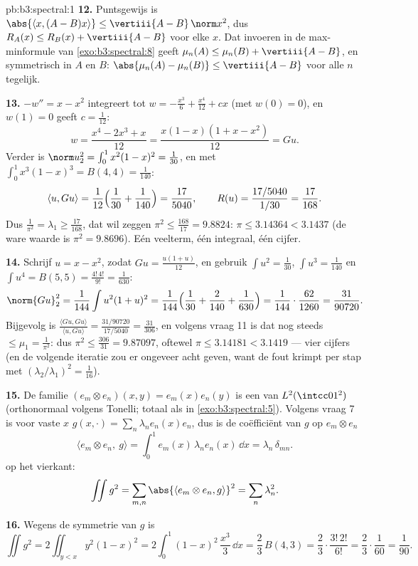 \begin{solution}{pb:b3:spectral:1}
\textbf{12.} Puntsgewijs is $\abs{\langle x, (A - B)x\rangle}
\leq \vertiii{A - B}\,\norm x^2$, dus $R_A(x) \leq R_B(x) +
\vertiii{A - B}$ voor elke $x$. Dat invoeren in de
max-minformule van \cref{exo:b3:spectral:8} geeft $\mu_n(A) \leq
\mu_n(B) + \vertiii{A - B}$, en symmetrisch in $A$ en $B$:
$\abs{\mu_n(A) - \mu_n(B)} \leq \vertiii{A - B}$ voor alle $n$
tegelijk.

\textbf{13.} $-w'' = x - x^2$ integreert tot $w = -\frac{x^3}6 +
\frac{x^4}{12} + cx$ (met $w(0) = 0$), en $w(1) = 0$ geeft $c =
\frac1{12}$:
\[
w = \frac{x^4 - 2x^3 + x}{12} = \frac{x(1-x)(1 + x -
x^2)}{12} = Gu .
\]
Verder is $\norm u_2^2 = \int_0^1x^2(1-x)^2 = \frac1{30}$, en met
$\int_0^1x^3(1-x)^3 = B(4,4) = \frac1{140}$:
\[
\langle u, Gu\rangle = \frac1{12}\Bigl(\frac1{30} +
\frac1{140}\Bigr) = \frac{17}{5040},
\qquad
R(u) = \frac{17/5040}{1/30} = \frac{17}{168} .
\]
Dus $\frac1{\pi^2} = \lambda_1 \geq \frac{17}{168}$, dat wil
zeggen $\pi^2 \leq \frac{168}{17} = 9.8824$: $\pi \leq 3.14364 <
3.1437$ (de ware waarde is $\pi^2 = 9.8696$). Eén veelterm, één
integraal, één cijfer.

\textbf{14.} Schrijf $u = x - x^2$, zodat $Gu = \frac{u(1 +
u)}{12}$, en gebruik $\int u^2 = \frac1{30}$, $\int u^3 =
\frac1{140}$ en $\int u^4 = B(5,5) = \frac{4!\,4!}{9!} =
\frac1{630}$:
\[
\norm{Gu}_2^2 = \frac1{144}\int u^2(1+u)^2 =
\frac1{144}\Bigl(\frac1{30} + \frac2{140} +
\frac1{630}\Bigr) = \frac1{144}\cdot\frac{62}{1260} =
\frac{31}{90720} .
\]
Bijgevolg is $\frac{\langle Gu, Gu\rangle}{\langle u, Gu\rangle}
= \frac{31/90720}{17/5040} = \frac{31}{306}$, en volgens vraag 11
is dat nog steeds $\leq \mu_1 = \frac1{\pi^2}$: dus $\pi^2 \leq
\frac{306}{31} = 9.87097$, oftewel $\pi \leq 3.14181 < 3.1419$
--- vier cijfers (en de volgende iteratie zou er ongeveer acht
geven, want de fout krimpt per stap met
$(\lambda_2/\lambda_1)^2 = \frac1{16}$).

\textbf{15.} De familie $(e_m \otimes e_n)(x,y) = e_m(x)e_n(y)$
is een  van $L^2(\intcc01^2)$ (orthonormaal volgens
Tonelli; totaal als in \cref{exo:b3:spectral:5}). Volgens vraag 7
is voor vaste $x$ $g(x, \cdot) = \sum_n\lambda_ne_n(x)e_n$, dus
is de coëfficiënt van $g$ op $e_m\otimes e_n$
\[
\langle e_m\otimes e_n,\ g\rangle
= \int_0^1 e_m(x)\,\lambda_n e_n(x)\,\dd x
= \lambda_n\,\delta_{mn} .
\]
 op het vierkant:
\[
\iint g^2 = \sum_{m,n}\abs{\langle e_m\otimes e_n,
g\rangle}^2 = \sum_n\lambda_n^2 .
\]

\textbf{16.} Wegens de symmetrie van $g$ is
\[
\iint g^2 = 2\iint_{y<x}y^2(1-x)^2
= 2\int_0^1(1-x)^2\,\frac{x^3}3\,\dd x
= \frac23\,B(4, 3) = \frac23\cdot\frac{3!\,2!}{6!}
= \frac23\cdot\frac1{60} = \frac1{90} .
\]


\end{solution}
